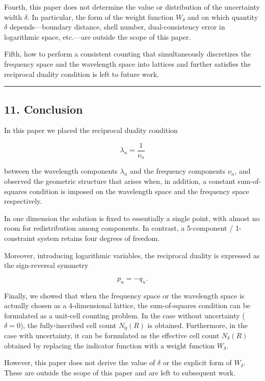 \documentclass[
]{article}
\begin{document}
Fourth, this paper does not determine the value or distribution of the
uncertainty width \(\delta\). In particular, the form of the weight
function \(W_\delta\) and on which quantity \(\delta\)
depends---boundary distance, shell number, dual-consistency error in
logarithmic space, etc.---are outside the scope of this paper.

Fifth, how to perform a consistent counting that simultaneously
discretizes the frequency space and the wavelength space into lattices
and further satisfies the reciprocal duality condition is left to future
work.

\begin{center}\rule{0.5\linewidth}{0.5pt}\end{center}

\subsection{11. Conclusion}\label{conclusion}

In this paper we placed the reciprocal duality condition

\[
\lambda_n=\frac{1}{\nu_n}
\]

between the wavelength components \(\lambda_n\) and the frequency
components \(\nu_n\), and observed the geometric structure that arises
when, in addition, a constant sum-of-squares condition is imposed on the
wavelength space and the frequency space respectively.

In one dimension the solution is fixed to essentially a single point,
with almost no room for redistribution among components. In contrast, a
5-component / 1-constraint system retains four degrees of freedom.

Moreover, introducing logarithmic variables, the reciprocal duality is
expressed as the sign-reversal symmetry

\[
p_n=-q_n .
\]

Finally, we showed that when the frequency space or the wavelength space
is actually chosen as a 4-dimensional lattice, the sum-of-squares
condition can be formulated as a unit-cell counting problem. In the case
without uncertainty (\(\delta=0\)), the fully-inscribed cell count
\(N_0(R)\) is obtained. Furthermore, in the case with uncertainty, it
can be formulated as the effective cell count \(N_\delta(R)\) obtained
by replacing the indicator function with a weight function \(W_\delta\).

However, this paper does not derive the value of \(\delta\) or the
explicit form of \(W_\delta\). These are outside the scope of this paper
and are left to subsequent work.
\end{document}
